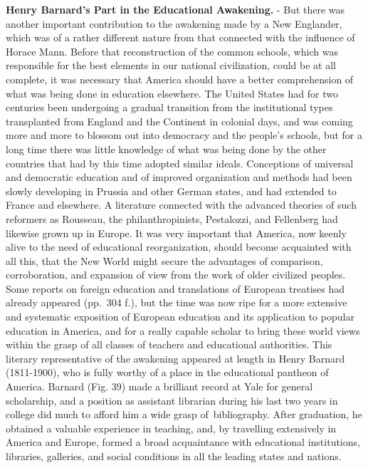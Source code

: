 \documentclass[]{book}
\begin{document}
\textbf{Henry Barnard's Part in the Educational Awakening.} - But there was another important contribution to the awakening made by a New Englander, which was of a rather different nature from that connected with the influence of Horace Mann. Before that reconstruction of the common schools, which was responsible for the best elements in our national civilization, could be at all complete, it was necessary that America should have a better comprehension of what was being done in education elsewhere. The United States had for two centuries been undergoing a gradual transition from the institutional types transplanted from England and the Continent in colonial days, and was coming more and more to blossom out into democracy and the people's schools, but for a long time there was little knowledge of what was being done by the other countries that had by this time adopted similar ideals. Conceptions of universal and democratic education and of improved organization and methods had been slowly developing in Prussia and other German states, and had extended to France and elsewhere. A literature connected with the advanced theories of such reformers as Rousseau, the philanthropinists, Pestalozzi, and Fellenberg had likewise grown up in Europe. It was very important that America, now keenly alive to the need of educational reorganization, should become acquainted with all this, that the New World might secure the advantages of comparison, corroboration, and expansion of view from the work of older civilized peoples. Some reports on foreign education and translations of European treatises had already appeared (pp.~304 f.), but the time was now ripe for a more extensive and systematic exposition of European education and its application to popular education in America, and for a really capable scholar to bring these world views within the grasp of all classes of teachers and educational authorities. This literary representative of the awakening appeared at length in Henry Barnard (1811-1900), who is fully worthy of a place in the educational pantheon of America. Barnard (Fig. 39) made a brilliant record at Yale for general scholarship, and a position as assistant librarian during his last two years in college did much to afford him a wide grasp of~bibliography. After graduation, he obtained a valuable experience in teaching, and, by travelling extensively in America and Europe, formed a broad acquaintance with educational institutions, libraries, galleries, and social conditions in all the leading states and nations.
\end{document}

